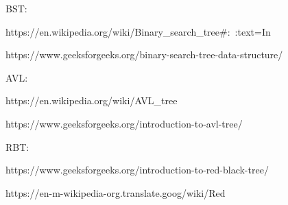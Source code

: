 BST:

https://en.wikipedia.org/wiki/Binary_search_tree#:~:text=In%

https://www.geeksforgeeks.org/binary-search-tree-data-structure/

AVL:

https://en.wikipedia.org/wiki/AVL_tree

https://www.geeksforgeeks.org/introduction-to-avl-tree/

RBT:

https://www.geeksforgeeks.org/introduction-to-red-black-tree/

https://en-m-wikipedia-org.translate.goog/wiki/Red%